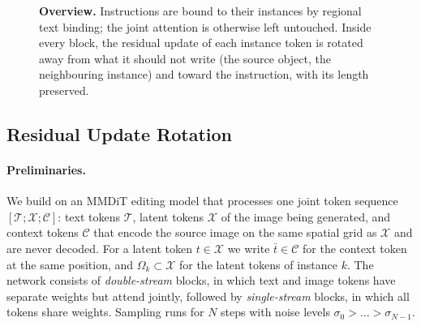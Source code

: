 \begin{figure}[t]
  \centering
  \caption{\textbf{Overview.} Instructions are bound to their instances by regional text binding; the
  joint attention is otherwise left untouched. Inside every block, the residual update of each instance
  token is rotated away from what it should not write (the source object, the neighbouring instance)
  and toward the instruction, with its length preserved.}
  \label{fig:overview}
\end{figure}

\subsection{Residual Update Rotation}
\label{sec:rotation}

\paragraph{Preliminaries.}
We build on an MMDiT editing model that processes one joint token sequence
$[\mathcal{T}; \mathcal{X}; \mathcal{C}]$: text tokens $\mathcal{T}$, latent tokens $\mathcal{X}$ of the
image being generated, and context tokens $\mathcal{C}$ that encode the source image on the same spatial
grid as $\mathcal{X}$ and are never decoded. For a latent token $t \in \mathcal{X}$ we write $\bar t \in
\mathcal{C}$ for the context token at the same position, and $\Omega_k \subset \mathcal{X}$ for the latent
tokens of instance $k$. The network consists of \emph{double-stream} blocks, in which text and image tokens
have separate weights but attend jointly, followed by \emph{single-stream} blocks, in which all tokens share
weights. Sampling runs for $N$ steps with noise levels $\sigma_0 > \dots > \sigma_{N-1}$.

